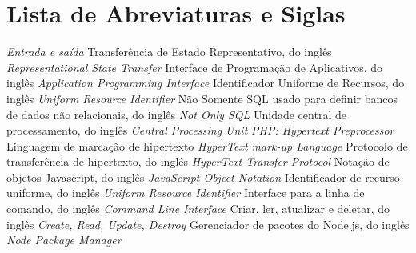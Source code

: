 \chapter*{Lista de Abreviaturas e Siglas}


\begin{acronym}
 {\textit{Entrada e saída}}
 {Transferência de Estado Representativo, do inglês \textit{Representational State Transfer}}
 {Interface de Programação de Aplicativos, do inglês \textit{Application Programming Interface}}
 {Identificador Uniforme de Recursos, do inglês \textit{Uniform Resource Identifier}}
 {Não Somente SQL usado para definir bancos de dados não relacionais, do inglês \textit{Not Only SQL}}
 {Unidade central de processamento, do inglês \textit{Central Processing Unit}}
 {\textit{PHP: Hypertext Preprocessor}}
 {Linguagem de marcação de hipertexto \textit{HyperText mark-up Language}}
 {Protocolo de transferência de hipertexto, do inglês \textit{HyperText Transfer Protocol}}
 {Notação de objetos Javascript, do inglês \textit{JavaScript Object Notation}}
 {Identificador de recurso uniforme, do inglês \textit{Uniform Resource Identifier}}
 {Interface para a linha de comando, do inglês \textit{Command Line Interface}}
 {Criar, ler, atualizar e deletar, do inglês \textit{Create, Read, Update, Destroy}}
 {Gerenciador de pacotes do Node.js, do inglês \textit{Node Package Manager}}


\end{acronym}